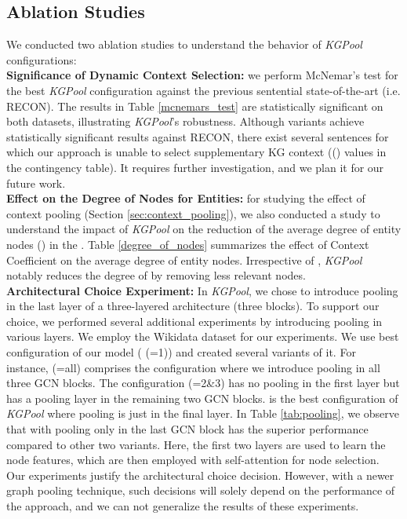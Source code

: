\documentclass[11pt,a4paper]{article}
\begin{document}
\subsection{Ablation Studies}
We conducted two ablation studies to understand the behavior of \textit{KGPool} configurations:\\
\textbf{Significance of Dynamic Context Selection:} we perform McNemar's test for the best \textit{KGPool} configuration against the previous sentential state-of-the-art (i.e. RECON). The results in Table \ref{mcnemars_test} are statistically significant on both datasets, illustrating \textit{KGPool}'s robustness. Although  variants achieve statistically significant results against RECON, there exist several sentences for which our approach is unable to select supplementary KG context (() values in the contingency table). It requires further investigation, and we plan it for our future work.\\
\textbf{Effect on the Degree of Nodes for Entities:} for studying the effect of context pooling (Section \ref{sec:context_pooling}), we also conducted a study to understand the impact of \textit{KGPool} on the reduction of the average degree of entity nodes () in the . Table \ref{degree_of_nodes} summarizes the effect of Context Coefficient on the average degree of entity nodes. Irrespective of , \textit{KGPool} notably reduces the degree of  by removing less relevant nodes. \\
\textbf{Architectural Choice Experiment:}
In \textit{KGPool}, we chose to introduce pooling in the last layer of a three-layered architecture (three blocks). To support our choice, we performed several additional experiments by introducing pooling in various layers. We employ the Wikidata dataset for our experiments. We use best configuration of our model (  (=1)) and created several variants of it. For instance,   (=all) comprises the configuration where we introduce pooling in all three GCN blocks. The configuration  (=2\&3) has no pooling in the first layer but has a pooling layer in the remaining two GCN blocks.   is the best configuration of \textit{KGPool} where pooling is just in the final layer. In Table \ref{tab:pooling}, we observe that  with pooling only in the last GCN block has the superior performance compared to other two variants.
Here, the first two layers are used to learn the node features, which are then employed with self-attention for node selection. Our experiments justify the architectural choice decision. However, with a newer graph pooling technique, such decisions will solely depend on the performance of the approach, and we can not generalize the results of these experiments. 
\end{document}
